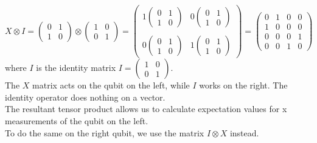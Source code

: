 \documentclass[hidelinks, a4paper, 12pt]{article}
\newcommand{\n}{\\[\baselineskip]}
\begin{document}
            \[X \otimes I = \begin{pmatrix} 0 & 1 \\ 1 & 0 \end{pmatrix} \otimes \begin{pmatrix} 1 & 0 \\ 0 & 1 \end{pmatrix} 
            = \begin{pmatrix} 1 \begin{pmatrix} 0 & 1 \\ 1 & 0 \end{pmatrix} & 0 \begin{pmatrix} 0 & 1 \\ 1 & 0 \end{pmatrix} \\ \\ 0 \begin{pmatrix} 0 & 1 \\ 1 & 0 \end{pmatrix} & 1 \begin{pmatrix} 0 & 1 \\ 1 & 0 \end{pmatrix} \end{pmatrix}
            = \begin{pmatrix} 0 & 1 & 0 & 0 \\ 1 & 0 & 0 & 0  \\ 0 & 0 & 0 & 1 \\ 0 & 0 & 1 & 0\end{pmatrix}\]
            where $I$ is the identity matrix $I = \begin{pmatrix} 1 & 0 \\ 0 & 1 \end{pmatrix}$.\n
            The $X$ matrix acts on the qubit on the left, while $I$ works on the right. The identity operator does nothing on a vector.\n
            The resultant tensor product allows us to calculate expectation values for x measurements of the qubit on the left.\n
            To do the same on the right qubit, we use the matrix $I \otimes X$ instead.
\end{document}
